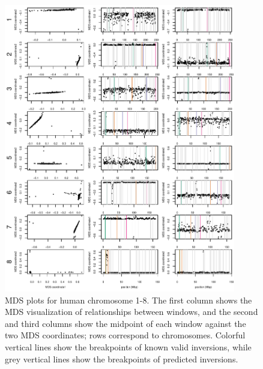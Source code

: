 \documentclass[11pt, oneside]{article}   	%
\begin{document}
\begin{figure}
    \begin{center}
       \includegraphics[width=0.9\textwidth]{FigS_human_MDS12_chr1_8_all_valid_and_pre}
    \end{center}
    \caption{
         MDS plots for human chromosome 1-8.
         The first column shows the MDS visualization of relationships between windows, 
         and the second and third columns show the midpoint of each window against the two MDS coordinates; 
         rows correspond to chromosomes.        
         Colorful vertical lines show the breakpoints of known valid inversions, 
         while grey vertical lines show the breakpoints of predicted inversions.
        \label{fig:mds12_chr1_8_human}
    }
\end{figure}
\end{document}
